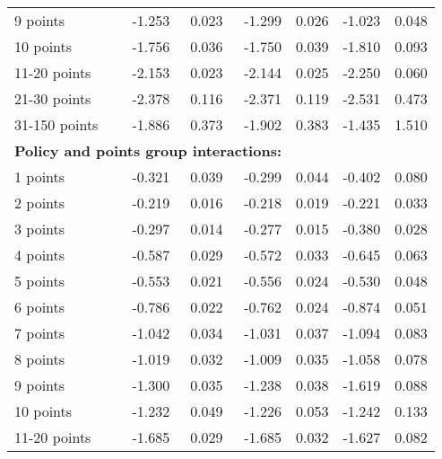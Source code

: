 \begin{table}
\begin{tabular}{l r r r r r r}
9 points  & -1.253  &  0.023  & -1.299  &  0.026  & -1.023  &  0.048   \\ 
 
10 points  & -1.756  &  0.036  & -1.750  &  0.039  & -1.810  &  0.093   \\ 
 
11-20 points  & -2.153  &  0.023  & -2.144  &  0.025  & -2.250  &  0.060   \\ 
 
21-30 points  & -2.378  &  0.116  & -2.371  &  0.119  & -2.531  &  0.473   \\ 
 
31-150 points  & -1.886  &  0.373  & -1.902  &  0.383  & -1.435  &  1.510   \\ 
 

\hline 
 
\multicolumn{4}{l}{\textbf{Policy and points group interactions:}}  \\ 
 
1 points  & -0.321  &  0.039  & -0.299  &  0.044  & -0.402  &  0.080   \\ 
 
2 points  & -0.219  &  0.016  & -0.218  &  0.019  & -0.221  &  0.033   \\ 
 
3 points  & -0.297  &  0.014  & -0.277  &  0.015  & -0.380  &  0.028   \\ 
 
4 points  & -0.587  &  0.029  & -0.572  &  0.033  & -0.645  &  0.063   \\ 
 
5 points  & -0.553  &  0.021  & -0.556  &  0.024  & -0.530  &  0.048   \\ 
 
6 points  & -0.786  &  0.022  & -0.762  &  0.024  & -0.874  &  0.051   \\ 
 
7 points  & -1.042  &  0.034  & -1.031  &  0.037  & -1.094  &  0.083   \\ 
 
8 points  & -1.019  &  0.032  & -1.009  &  0.035  & -1.058  &  0.078   \\ 
 
9 points  & -1.300  &  0.035  & -1.238  &  0.038  & -1.619  &  0.088   \\ 
 
10 points  & -1.232  &  0.049  & -1.226  &  0.053  & -1.242  &  0.133   \\ 
 
11-20 points  & -1.685  &  0.029  & -1.685  &  0.032  & -1.627  &  0.082   \\ 
 

\end{tabular}
\end{table}
